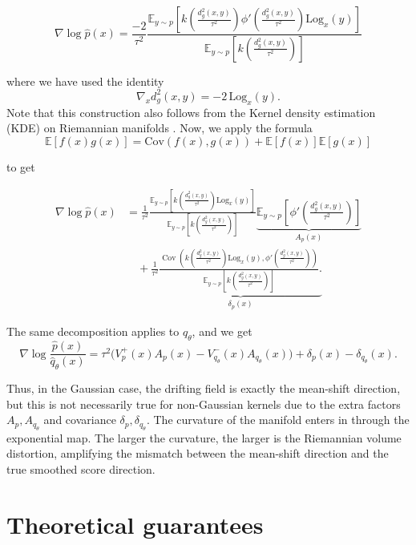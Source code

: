 \documentclass{article}
\theoremstyle{plain}
\newcommand{\Log}{\mathrm{Log}}
\begin{document}
\[
\nabla \log \hat p(x)
=
\frac{-2}{\tau^2}
\frac{
\mathbb{E}_{y\sim p}
\!\left[
k\!\left(
\frac{d^2_g(x,y)}{\tau^2}
\right)
\phi'\!\left(
\frac{d^2_g(x,y)}{\tau^2}
\right)
\Log_{x}(y)
\right]
}{
\mathbb{E}_{y\sim p}
\!\left[
k\!\left(
\frac{d^2_g(x,y)}{\tau^2}
\right)
\right]
}
\]

where we have used the identity
\[
\nabla_{x} d^2_g(x,y) = -2\,\Log_{x}(y).
\] 
Note that this construction also follows from the Kernel density estimation (KDE) on Riemannian manifolds \citep{Subbarao2009NonlinearMeanShift}.  Now, we apply the formula 
\[ \mathbb{E}[f(x)g(x)]=\text{Cov}(f(x),g(x))+\mathbb{E}[f(x)]\mathbb{E}[g(x)]\]

to get

\[
\begin{aligned}
\nabla \log \hat p(x)
&=
\frac{1}{\tau^2}
\frac{
\mathbb{E}_{y\sim p}
\!\left[
k\!\left(
\frac{d^2_g(x,y)}{\tau^2}
\right)
\Log_{x}(y)
\right]
}{
\mathbb{E}_{y\sim p}
\!\left[
k\!\left(
\frac{d^2_g(x,y)}{\tau^2}
\right)
\right]
} 
\underbrace{
\mathbb{E}_{y\sim p}
\!\left[
\phi'\!\left(
\frac{d^2_g(x,y)}{\tau^2}
\right)
\right]}_{A_p(x)}
\\
&\quad
+ \frac{1}{\tau^2}\underbrace{\frac{\operatorname{Cov}\!\left(
k\!\left(
\frac{d^2_g(x,y)}{\tau^2}
\right)
\Log_{x}(y),
\phi'\!\left(
\frac{d^2_g(x,y)}{\tau^2}
\right)
\right)}{\mathbb{E}_{y\sim p}
\!\left[
k\!\left(
\frac{d^2_g(x,y)}{\tau^2}
\right)
\right]}.}_{\delta_p(x)}
\end{aligned}
\]

The same decomposition applies to $q_\theta$, and we get 
\[ \nabla\log \frac{\hat p (x)}{\hat q_\theta (x)} = \tau^2\big(V^+_{p}(x) A_p(x)- V^-_{q_\theta}(x) A_{q_\theta}(x) \big) + \delta_p(x) - \delta_{q_\theta}(x).\]


Thus, in the Gaussian case, the drifting field is exactly the mean-shift direction, but this is not necessarily true for non-Gaussian kernels due to the extra factors $A_p, A_{q_\theta}$ and covariance $\delta_p, \delta_{q_\theta}$. The curvature of the manifold enters in through the exponential map. The larger the curvature, the larger is the Riemannian volume distortion, amplifying the mismatch between the mean-shift direction and the true smoothed score direction.


\section{Theoretical guarantees} \label{app: theoretical guarantees}
\end{document}
